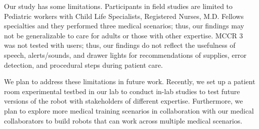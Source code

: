 Our study has some limitations.
Participants in field studies are limited to Pediatric workers with Child Life Specialists, Registered Nurses, M.D. Fellows specialties and they performed three medical scenarios; thus, our findings may not be generalizable to care for adults or those with other expertise.
MCCR 3 was not tested with users; thus, our findings do not reflect the usefulness of speech, alerts/sounds, and drawer lights for recommendations of supplies, error detection, and procedural steps during patient care.

We plan to address these limitations in future work.
Recently, we set up a patient room experimental testbed in our lab to conduct in-lab studies to test future versions of the robot with stakeholders of different expertise. %
Furthermore, we plan to explore more medical training scenarios in collaboration with our medical collaborators to build robots that can work across multiple medical scenarios.

